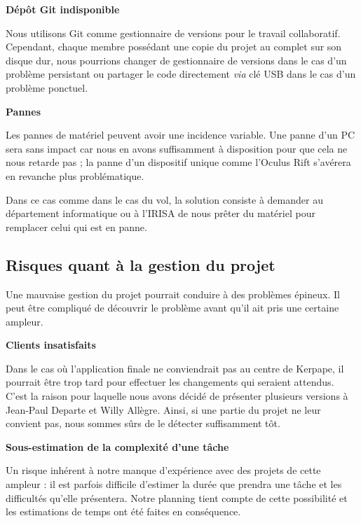 \textbf{Dépôt Git indisponible}

Nous utilisons Git comme gestionnaire de versions pour le travail collaboratif. Cependant, chaque membre possédant une copie du projet au complet sur son disque dur, nous pourrions changer de gestionnaire de versions dans le cas d'un problème persistant ou partager le code directement \emph{via} clé USB dans le cas d'un problème ponctuel.

\textbf{Pannes}

Les pannes de matériel peuvent avoir une incidence variable. Une panne d'un PC sera sans impact car nous en avons suffisamment à disposition pour que cela ne nous retarde pas ; la panne d'un dispositif unique comme l'Oculus Rift s'avérera en revanche plus problématique.

Dans ce cas comme dans le cas du vol, la solution consiste à demander au département informatique ou à l'IRISA de nous prêter du matériel pour remplacer celui qui est en panne.

\subsection{Risques quant à la gestion du projet}
Une mauvaise gestion du projet pourrait conduire à des problèmes épineux. Il peut être compliqué de découvrir le problème avant qu'il ait pris une certaine ampleur. 

\textbf{Clients insatisfaits}

Dans le cas où l'application finale ne conviendrait pas au centre de Kerpape, il pourrait être trop tard pour effectuer les changements qui seraient attendus. C'est la raison pour laquelle nous avons décidé de présenter plusieurs versions à Jean-Paul Departe et Willy Allègre. Ainsi, si une partie du projet ne leur convient pas, nous sommes sûrs de le détecter suffisamment tôt. 

\textbf{Sous-estimation de la complexité d'une tâche}

Un risque inhérent à notre manque d'expérience avec des projets de cette ampleur : il est parfois difficile d'estimer la durée que prendra une tâche et les difficultés qu'elle présentera. Notre planning tient compte de cette possibilité et les estimations de temps ont été faites en conséquence.
